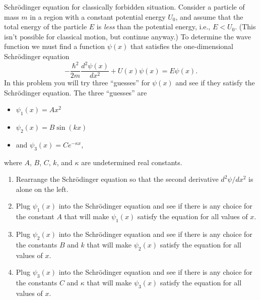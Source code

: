 \begin{aproblem}{Schr\"{o}dinger equation for classically forbidden
situation.}  
  Consider a particle of mass $m$ in a region with a constant
  potential energy $U_0$, and assume that the total energy of the
  particle $E$ is {\em less} than the potential energy, i.e., $E<U_0$.
  (This isn't possible for classical motion, but continue anyway.)  To
  determine the wave function we must find a function $\psi(x)$ that
  satisfies the one-dimensional Schr\"{o}dinger equation
  \[ -\frac{\hbar^2}{2m} \frac{d^2\psi(x)}{dx^2} + U(x)\psi(x) 
  = E\psi(x).  
  \]
  In this problem you will try three ``guesses'' for $\psi(x)$ and see
  if they satisfy the Schr\"{o}dinger equation. The three ``guesses''
  are
  \begin{itemize}
  \item $\psi_1(x) = Ax^2$ 
  \item $\psi_2(x) = B\sin(kx)$
  \item and $\psi_3(x) = Ce^{-\kappa x}$,
  \end{itemize}
  where $A$, $B$, $C$, $k$, and $\kappa$ are undetermined real
  constants.
  \begin{enumerate}
  \item Rearrange the Schr\"{o}dinger equation so that the second
    derivative $d^2\psi/dx^2$ is alone on the left.
  \item Plug $\psi_1(x)$ into the Schr\"{o}dinger equation and see if
    there is any choice for the constant $A$ that will make
    $\psi_1(x)$ satisfy the equation for all values of $x$.
  \item Plug $\psi_2(x)$ into the Schr\"{o}dinger equation and see if
    there is any choice for the constants $B$ and $k$ that will make
    $\psi_2(x)$ satisfy the equation for all values of $x$.
  \item Plug $\psi_3(x)$ into the Schr\"{o}dinger equation and see if
    there is any choice for the constants $C$ and $\kappa$ that will
    make $\psi_3(x)$ satisfy the equation for all values of $x$.
  \end{enumerate} 
\end{aproblem}

